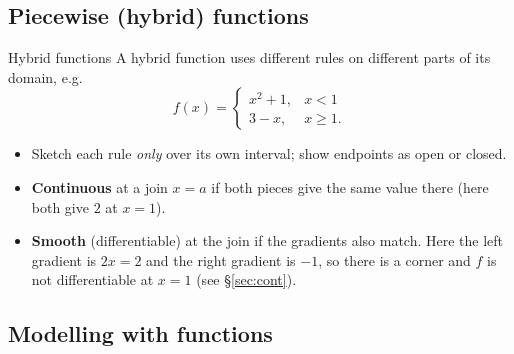 \subsection{Piecewise (hybrid) functions}
\label{sec:hybrid}

\begin{cols}
\begin{defn}{Hybrid functions}
A hybrid function uses different rules on different parts of its domain, e.g.
\[f(x)=\begin{cases} x^2+1, & x<1\\ 3-x, & x\ge1.\end{cases}\]
\begin{itemize}
  \item Sketch each rule \emph{only} over its own interval; show endpoints as open or closed.
  \item \textbf{Continuous} at a join $x=a$ if both pieces give the same value there (here both give $2$ at $x=1$).
  \item \textbf{Smooth} (differentiable) at the join if the gradients also match. Here the left gradient is $2x=2$ and the right gradient is $-1$, so there is a corner and $f$ is not differentiable at $x=1$ (see \S\ref{sec:cont}).
\end{itemize}
\end{defn}
\nextcol
\centering
{}
\end{cols}

\subsection{Modelling with functions}
\label{sec:model}

